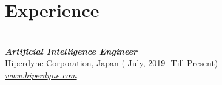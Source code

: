 \documentclass[letterpaper]{twentysecondcv} %
\begin{document}
\makeprofile %


\section{Experience}\\



{\bfseries \itshape \color{black} Artificial Intelligence Engineer} \\
{Hiperdyne Corporation, Japan }{\color{golden}  ( July, 2019- Till Present) }\\
{ \href {https://www.hiperdyne.com}{\itshape \color{blue} www.hiperdyne.com}}
\end{document}
